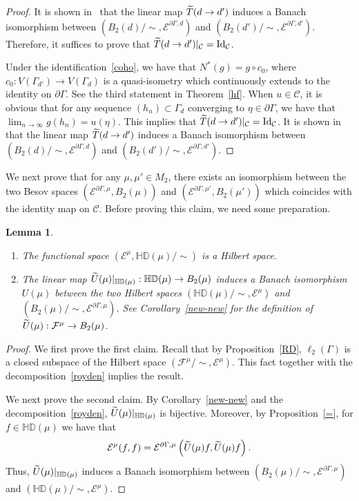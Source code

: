 \documentclass[10pt]{amsart}
\newtheorem{lemm}[theo]{Lemma}\newtheorem{prop}[theo]{Proposition}\newtheorem{coro}[theo]{Corollary}\newtheorem{conj}[theo]{Conjecture}
\theoremstyle{definition}\newtheorem{defi}[theo]{Definition}\newtheorem{rema}[theo]{Remark}\newtheorem{exam}[theo]{Example}\newtheorem{exem}[theo]{Example}\newtheorem{nota}[theo]{Notation}
\newcommand{\ce}{\mathcal{E}}
\newcommand{\cf}{\mathcal{F}}
\newcommand{\cC}{\mathcal{C}}
\newcommand{\bHD}{\mathbb{HD}}
\newcommand{\rmId}{\mathrm{Id}}
\let\oldtilde\tilde
\renewcommand*{\tilde}[1]{\mathchoice{\widetilde{#1}}{\widetilde{#1}}{\oldtilde{#1}}{\oldtilde{#1}}}
\begin{document}
\begin{proof}
It is shown in~\cite{BP} that the linear map $\tilde{T}(d\to d')$ induces a Banach isomorphism between $(B_2(d)/\sim,\ce^{\partial\Gamma,d})$ and $(B_2(d')/\sim,\ce^{\partial\Gamma,d'})$. Therefore, it suffices to prove that $\tilde{T}(d\to d')|_{\cC}=\rmId_{\cC}$.

Under the identification~\eqref{coho}, we have that $N^*(g)=g\circ c_0$, where $c_0:V(\Gamma_{d'})\rightarrow V(\Gamma_{d})$ is a quasi-isometry which continuously extends to the identity on $\partial\Gamma$. See the third statement in Theorem~\ref{hf}. When $u\in\cC$, it is obvious that for any sequence $(h_n)\subset\Gamma_{d}$ converging to $\eta\in\partial\Gamma$, we have that $\lim_{n\to\infty}g(h_n)=u(\eta)$. This implies that $\tilde{T}(d\to d')|_\cC=\rmId_\cC$. It is shown in~\cite{BP} that the linear map $\tilde{T}(d\to d')$ induces a Banach isomorphism between $(B_2(d)/\sim,\ce^{\partial\Gamma,d})$ and $(B_2(d')/\sim,\ce^{\partial\Gamma,d'})$.
\end{proof}


We next prove that for any $\mu,\mu'
\in M_2$, there exists an isomorphism between the two Besov spaces $(\ce^{\partial\Gamma,\mu},B_2(\mu))$ and $(\ce^{\partial\Gamma,\mu'},B_2(\mu'))$ which coincides with the identity map on $\cC$. Before proving this claim, we need some preparation.



\begin{lemm}\label{umu}\leavevmode
\begin{enumerate}
\item\label{lemm5.13.1} The functional space $(\ce^{\mu},\bHD(\mu)/\sim)$ is a Hilbert space.
\item\label{lemm5.13.2} The linear map $\tilde{U}(\mu)|_{\bHD(\mu)}:\bHD(\mu)\to B_2(\mu)$ induces a Banach isomorphism $U(\mu)$ between the two Hilbert spaces $(\bHD(\mu)/\sim,\ce^{\mu})$ and $(B_2(\mu)/\sim,\ce^{\partial\Gamma,\mu})$. See Corollary~\ref{new-new} for the definition of $\tilde{U}(\mu):\cf^{\mu}\to B_2(\mu)$.
\end{enumerate}
\end{lemm}

\begin{proof}
We first prove the first claim. Recall that by Proposition~\ref{RD}, $\ell_2(\Gamma)$ is a closed subspace of the Hilbert space $(\cf^{\mu}/\sim,\ce^{\mu})$. This fact together with the decomposition~\eqref{royden} implies the result.

We next prove the second claim. By Corollary~\ref{new-new} and the decomposition~\eqref{royden}, $\tilde{U}(\mu)|_{\bHD(\mu)}$ is bijective. Moreover, by Proposition~\ref{=}, for $f\in\bHD(\mu)$ we have that
\begin{align*}
\ce^{\mu}(f,f)=\ce^{\partial\Gamma,\mu}\left(\tilde{U}(\mu)f,\tilde{U}(\mu)f\right).
\end{align*}
Thus, $\tilde{U}(\mu)|_{\bHD(\mu)}$ induces a Banach isomorphism between $(B_2(\mu)/\sim,\ce^{\partial\Gamma,\mu})$ and $(\bHD(\mu)/\sim,\ce^{\mu})$.
\end{proof}
\end{document}
